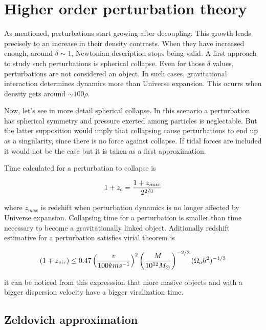 \section{ Higher order perturbation theory }

As mentioned, perturbations start growing after decoupling. This growth leads
precisely to an increase in their density contrasts. 
When they have increased enough, around $\delta\sim 1$, Newtonian description 
stops being valid. A first approach to study such perturbations is spherical collapse. 
Even for those $\delta$ values, perturbations are not considered an object. 
In such cases, gravitational interaction determines dynamics more than Universe
expansion. This ocurrs when density gets around $\sim 100 \overline{\rho}$. 

Now, let's see in more detail spherical collapse. In this scenario a perturbation
has spherical symmetry and pressure exerted among particles is neglectable. 
But the latter supposition would imply that collapsing cause perturbations 
to end up as a singularity, since there is no force against collapse.
If tidal forces are included it would not be the case but it is taken 
as a first approximation.

Time calculated for a perturbation to collapse is 

\[
1+z_c = \frac{1+z_{max}}{2^{2/3}}
\]

where $z_{max}$ is redshift when perturbation dynamics is no longer affected by Universe
expansion. Collapsing time for a perturbation is smaller than time necessary to become 
a gravitationally linked object. Aditionally redshift estimative for a perturbation
satisfies virial theorem is

\[
(1+z_{vir})\leq 0.47\left( \frac{v}{100kms^{-1}}\right)^2\left( \frac{M}{10^{12}M_{\odot}}\right)^{-2/3}(\Omega_oh^2)^{-1/3}
\]

it can be noticed from this expresssion that more masive objects and with a bigger 
dispersion velocity have a bigger viralization time. 

\subsection{ Zeldovich approximation }

